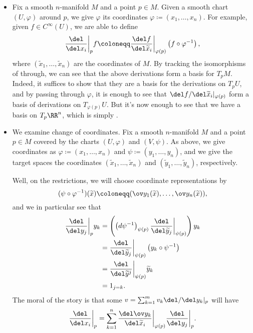 \documentclass[../notes.tex]{subfiles}
\begin{document}
\begin{itemize}
	\item Fix a smooth $n$-manifold $M$ and a point $p\in M$. Given a smooth chart $(U,\varphi)$ around $p$, we give $\varphi$ its coordinates $\varphi\coloneqq(x_1,\ldots,x_n)$. For example, given $f\in C^\infty(U)$, we are able to define
	\[\frac{\del}{\del x_i}\bigg|_pf\coloneqq\frac{\del f}{\del\widetilde x_i}\bigg|_{\varphi(p)}\left(f\circ\varphi^{-1}\right),\]
	where $(\widetilde x_1,\ldots,\widetilde x_n)$ are the coordinates of $M$. By tracking the isomorphisms of  through, we can see that the above derivations form a basis for $T_pM$. Indeed, it suffices to show that they are a basis for the derivations on $T_pU$, and by passing through $\varphi$, it is enough to see that $\del f/\del\widetilde x_i|_{\varphi(p)}$ form a basis of derivations on $T_{\varphi(p)}U$. But it's now enough to see that we have a basis on $T_p\RR^n$, which is simply .

	\item We examine change of coordinates. Fix a smooth $n$-manifold $M$ and a point $p\in M$ covered by the charts $(U,\varphi)$ and $(V,\psi)$. As above, we give coordinates as $\varphi\coloneqq(x_1,\ldots,x_n)$ and $\psi\coloneqq(y_1,\ldots,y_n)$, and we give the target spaces the coordinates $(\widetilde x_1,\ldots,\widetilde x_n)$ and $(\widetilde y_1,\ldots,\widetilde y_n)$, respectively.

	Well, on the restrictions, we will choose coordinate representations by
	\[(\psi\circ\varphi^{-1})(\widetilde x)\coloneqq(\ov y_1(\widetilde x),\ldots,\ov y_n(\widetilde x)),\]
	and we in particular see that
	\begin{align*}
		\frac{\del}{\del y_j}\bigg|_py_k &= \left(\left(d\psi^{-1}\right)_{\psi(p)}\frac{\del}{\del\widetilde y_j}\bigg|_{\psi(p)}\right)y_k \\
		&= \frac{\del}{\del\widetilde y_j}\bigg|_{\psi(p)}\left(y_k\circ\psi^{-1}\right) \\
		&= \frac{\del}{\del\widetilde y^j}\bigg|_{\psi(p)}\widetilde y_k \\
		&= 1_{j=k}.
	\end{align*}
	The moral of the story is that some $v=\sum_{k=1}^mv_k\del/\del y_k|_p$ will have
	\begin{align*}
		\frac{\del}{\del x_i}\bigg|_p=\sum_{k=1}^n\frac{\del\ov y_k}{\del\widetilde x_i}\bigg|_{\varphi(p)}\frac{\del}{\del y_j}\bigg|_p.
	\end{align*}
\end{itemize}
\end{document}
